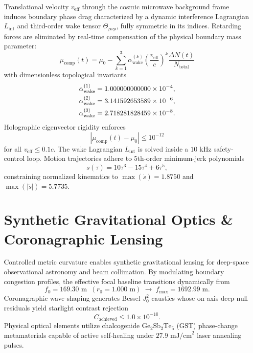 \documentclass[twocolumn,aps,pra,floatfix,superscriptaddress,10pt]{revtex4-2}
\begin{document}
Translational velocity $v_{\text{eff}}$ through the cosmic microwave background frame induces boundary phase drag characterized by a dynamic interference Lagrangian $L_{\text{int}}$ and third-order wake tensor $\Theta_{\mu\nu\rho}$, fully symmetric in its indices. Retarding forces are eliminated by real-time compensation of the physical boundary mass parameter:
\begin{equation}
\mu_{\text{comp}}(t) = \mu_0 - \sum_{k=1}^3 \alpha_{\text{wake}}^{(k)} \left( \frac{v_{\text{eff}}}{c} \right)^k \frac{\Delta N(t)}{N_{\text{total}}}
\end{equation}
with dimensionless topological invariants
\begin{align}
\alpha_{\text{wake}}^{(1)} &= 1.000000000000 \times 10^{-4}, \notag\\
\alpha_{\text{wake}}^{(2)} &= 3.141592653589 \times 10^{-6}, \\
\alpha_{\text{wake}}^{(3)} &= 2.718281828459 \times 10^{-8} . \notag
\end{align}
Holographic eigenvector rigidity enforces
\begin{equation}
|\mu_{\text{comp}}(t) - \mu_0| \le 10^{-12}
\end{equation}
for all $v_{\text{eff}} \le 0.1c$. The wake Lagrangian $L_{\text{int}}$ is solved inside a $10\text{ kHz}$ safety-control loop. Motion trajectories adhere to 5th-order minimum-jerk polynomials
\begin{equation}
s(\tau) = 10\tau^3 - 15\tau^4 + 6\tau^5 ,
\end{equation}
constraining normalized kinematics to $\max(\dot{s}) = 1.8750$ and $\max(|\ddot{s}|) = 5.7735$.

\section{Synthetic Gravitational Optics \& Coronagraphic Lensing}

Controlled metric curvature enables synthetic gravitational lensing for deep-space observational astronomy and beam collimation. By modulating boundary congestion profiles, the effective focal baseline transitions dynamically from
\begin{equation}
f_0 = 169.30\text{ m} \;\; (r_0 = 1.000\text{ m}) \; \longrightarrow \; f_{\max} = 1692.99\text{ m} .
\end{equation}
Coronagraphic wave-shaping generates Bessel $J_0^2$ caustics whose on-axis deep-null residuals yield starlight contrast rejection
\begin{equation}
C_{\text{achieved}} \le 1.0 \times 10^{-10} .
\end{equation}
Physical optical elements utilize chalcogenide $\mathrm{Ge}_2\mathrm{Sb}_2\mathrm{Te}_5$ (GST) phase-change metamaterials capable of active self-healing under $27.9\text{ mJ/cm}^2$ laser annealing pulses.
\end{document}
